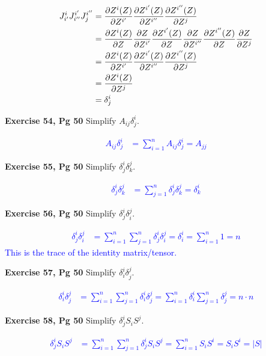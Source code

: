 \documentclass[12pt,a4paper]{report}
\newcommand{\BLUE}[1]{\textcolor{blue}{#1}}
\begin{document}
\begin{description}
	\BLUE{\begin{align*}
		J^{i}_{i'}J^{i'}_{i''}J^{i''}_{j}	&= \frac{\partial Z^{i}(Z)}{\partial Z^{i'}}\frac{\partial Z^{i'}(Z)}{\partial Z^{i''}}\frac{\partial Z^{i''}(Z)}{\partial Z^{j}} \\
		&= \frac{\partial Z^{i}(Z)}{\partial Z^{}}\frac{\partial Z}{\partial Z^{i'}}\frac{\partial Z^{i'}(Z)}{\partial Z^{}}\frac{\partial Z}{\partial Z^{i''}}\frac{\partial Z^{i''}(Z)}{\partial Z^{}}\frac{\partial Z}{\partial Z^j} \\
		&= \frac{\partial Z^i(Z)}{\partial Z^{i'}}\frac{\partial Z^{i'}(Z)}{\partial Z^{i''}}\frac{\partial Z^{i''}(Z)}{\partial Z^{j}} \\
		&= \frac{\partial Z^i(Z)}{\partial Z^{j}} \\
		&=  \delta^i_j
	\end{align*}
	}
	
	\item \textbf{Exercise 54, Pg 50} Simplify $A_{ij}\delta^i_j$.
	
	\BLUE{\begin{align*}
		A_{ij}\delta^i_j &= \sum_{i=1}^n A_{ij}\delta^i_j = A_{jj}
	\end{align*}
	}
	
	\item \textbf{Exercise 55, Pg 50} Simplify $\delta^i_{j}\delta^j_k$.
	
	\BLUE{\begin{align*}
		\delta^i_{j}\delta^j_k &= \sum_{j=1}^n \delta^i_{j}\delta^j_k = \delta^i_k
	\end{align*}
	}
	
	\item \textbf{Exercise 56, Pg 50} Simplify $\delta^i_{j}\delta^j_i$.
	
	\BLUE{\begin{align*}
		\delta^i_{j}\delta^j_i &= \sum_{i=1}^n\sum_{j=1}^n \delta^i_{j}\delta^j_i = \delta^i_i = \sum_{i=1}^n 1 = n
	\end{align*}This is the trace of the identity matrix/tensor.
	}
	
	\item \textbf{Exercise 57, Pg 50} Simplify $\delta^i_{i}\delta^j_j$.
	
	\BLUE{\begin{align*}
		\delta^i_{i}\delta^j_j &= \sum_{i=1}^n\sum_{j=1}^n \delta^i_{i}\delta^j_j = \sum_{i=1}^n\delta^i_{i}\sum_{j=1}^n \delta^j_j = n\cdot n
	\end{align*}
	}
	
	\item \textbf{Exercise 58, Pg 50} Simplify $\delta^i_{j}S_iS^j$.
	
	\BLUE{\begin{align*}
		\delta^i_{j}S_iS^j &= \sum_{i=1}^n\sum_{j=1}^n \delta^i_{j}S_iS^j = \sum_{i=1}^n S_iS^i = S_iS^i = |S|
	\end{align*}
	}
	

\end{description}
\end{document}
